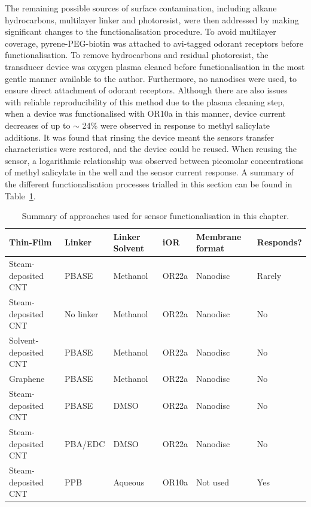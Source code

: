 \documentclass[
  a4paper,
]{scrbook}
\begin{document}
The remaining possible sources of surface contamination, including
alkane hydrocarbons, multilayer linker and photoresist, were then
addressed by making significant changes to the functionalisation
procedure. To avoid multilayer coverage, pyrene-PEG-biotin was attached
to avi-tagged odorant receptors before functionalisation. To remove
hydrocarbons and residual photoresist, the transducer device was oxygen
plasma cleaned before functionalisation in the most gentle manner
available to the author. Furthermore, no nanodiscs were used, to ensure
direct attachment of odorant receptors. Although there are also issues
with reliable reproducibility of this method due to the plasma cleaning
step, when a device was functionalised with OR10a in this manner, device
current decreases of up to \(\sim\) 24\% were observed in response to
methyl salicylate additions. It was found that rinsing the device meant
the sensors transfer characteristics were restored, and the device could
be reused. When reusing the sensor, a logarithmic relationship was
observed between picomolar concentrations of methyl salicylate in the
well and the sensor current response. A summary of the different
functionalisation processes trialled in this section can be found in
Table~\ref{tbl-method-summary}.

\hypertarget{tbl-method-summary}{}
\begin{longtable}[t]{>{\raggedright\arraybackslash}p{4.5cm}>{\raggedright\arraybackslash}p{1.6cm}>{\raggedright\arraybackslash}p{1.6cm}>{\raggedright\arraybackslash}p{1cm}>{\raggedright\arraybackslash}p{1.5cm}l}
\caption{\label{tbl-method-summary}Summary of approaches used for sensor functionalisation in this chapter. }\tabularnewline

\toprule
Thin-Film & Linker & Linker Solvent & iOR & Membrane format & Responds?\\
\midrule
Steam-deposited CNT & PBASE & Methanol & OR22a & Nanodisc & Rarely\\
Steam-deposited CNT & No linker & Methanol & OR22a & Nanodisc & No\\
Solvent-deposited CNT & PBASE & Methanol & OR22a & Nanodisc & No\\
Graphene & PBASE & Methanol & OR22a & Nanodisc & No\\
Steam-deposited CNT & PBASE & DMSO & OR22a & Nanodisc & No\\
\addlinespace
Steam-deposited CNT & PBA/EDC & DMSO & OR22a & Nanodisc & No\\
Steam-deposited CNT & PPB & Aqueous & OR10a & Not used & Yes\\
\bottomrule
\end{longtable}
\end{document}
